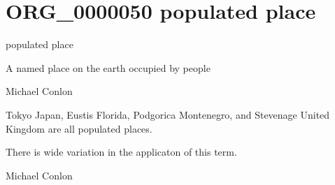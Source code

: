 \documentclass[letterpaper,10pt,english]{sphinxmanual}
\begin{document}
\section{ORG\_0000050 \sphinxhyphen{} populated place}
\label{\detokenize{doc-ORG_0000050:org-0000050-populated-place}}\label{\detokenize{doc-ORG_0000050:index-0}}\label{\detokenize{doc-ORG_0000050::doc}}
\begin{sphinxShadowBox}

\sphinxAtStartPar
populated place
\end{sphinxShadowBox}

\begin{sphinxShadowBox}

\sphinxAtStartPar
A named place on the earth occupied by people
\end{sphinxShadowBox}

\begin{sphinxShadowBox}

\sphinxAtStartPar
Michael Conlon 
\end{sphinxShadowBox}

\begin{sphinxShadowBox}

\sphinxAtStartPar
Tokyo Japan, Eustis Florida, Podgorica Montenegro, and Stevenage United Kingdom are all populated places.
\end{sphinxShadowBox}

\begin{sphinxShadowBox}

\sphinxAtStartPar
There is wide variation in the applicaton of this term.
\end{sphinxShadowBox}

\begin{sphinxShadowBox}

\sphinxAtStartPar
{}
\end{sphinxShadowBox}

\begin{sphinxShadowBox}

\sphinxAtStartPar
Michael Conlon 
\end{sphinxShadowBox}
\begin{quote}
\label{\detokenize{doc-ORG_0000051:org-0000051}}\label{\detokenize{doc-ORG_0000051:founding-process}}\label{\detokenize{doc-ORG_0000051:org-0000051}}
\ignorespaces \end{quote}
\end{document}
